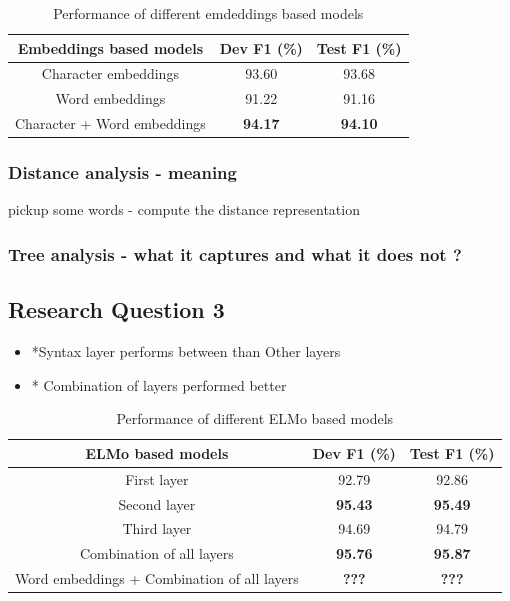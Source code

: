 \documentclass[a4paper, 11pt]{article}
\begin{document}
\begin{table}[h!]
  \begin{center}
    \label{tab:table1}
    \def\arraystretch{1.5}%
    \begin{tabular}{c|c|c}
      Embeddings based models & Dev F1 (\%) & Test F1 (\%) \\
      \hline
      Character embeddings & 93.60 & 93.68\\
      Word embeddings  & 91.22 & 91.16\\
      Character + Word embeddings & \textbf{94.17} & \textbf{94.10}\\
    \end{tabular}
    \caption{Performance of different emdeddings based models }
  \end{center}
\end{table}

\subsubsection{Distance analysis - meaning}
pickup some words - compute the distance representation

\subsubsection{Tree analysis - what it captures and what it does not ?}


\pagebreak
\subsection{Research Question 3}

\begin{itemize}
\item *Syntax layer performs between than Other layers
\item * Combination of layers performed better
\end{itemize}


\begin{table}[h!]
  \begin{center}
    \label{tab:table1}
    \def\arraystretch{1.5}%
    \begin{tabular}{c|c|c}
      ELMo based models & Dev F1 (\%) & Test F1 (\%) \\
      \hline
	  First layer & 92.79 & 92.86\\
      Second layer  & \textbf{95.43} & \textbf{95.49}\\
      Third layer & 94.69 & 94.79\\
      Combination of all layers & \textbf{95.76} & \textbf{95.87}\\     
      Word embeddings + Combination of all layers & \textbf{???} & \textbf{???}\\  
    \end{tabular}
    \caption{Performance of different ELMo based models}
  \end{center}
\end{table}
\end{document}
